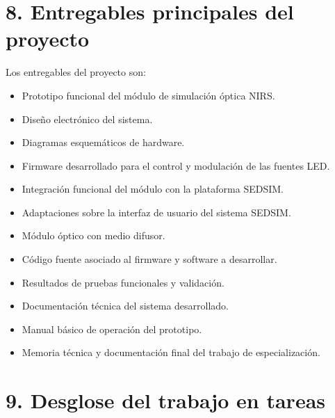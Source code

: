 \documentclass[
11pt, %
]{charter}
\begin{document}
\section{8. Entregables principales del proyecto}
\label{sec:entregables}

Los entregables del proyecto son:

\begin{itemize}

	\item Prototipo funcional del módulo de simulación óptica NIRS.
	
	\item Diseño electrónico del sistema.
	
	\item Diagramas esquemáticos de hardware.
	
	\item Firmware desarrollado para el control y modulación de las fuentes LED.
	
	\item Integración funcional del módulo con la plataforma SEDSIM.
	
	\item Adaptaciones sobre la interfaz de usuario del sistema SEDSIM.
	
	\item Módulo óptico con medio difusor.
	
	\item Código fuente asociado al firmware y software a desarrollar.
	
	\item Resultados de pruebas funcionales y validación.
	
	\item Documentación técnica del sistema desarrollado.
	
	\item Manual básico de operación del prototipo.
	
	\item Memoria técnica y documentación final del trabajo de especialización.

\end{itemize}

\section{9. Desglose del trabajo en tareas}
\label{sec:wbs}
\end{document}
